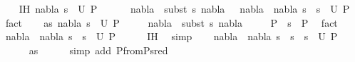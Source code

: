 \begin{isabellebody}
\ \ \isamarkupfalse%
\ IH{\isacharcolon}{\kern0pt}\ {\isachardoublequoteopen}{\isacharparenleft}{\kern0pt}nabla{}{\isacharcomma}{\kern0pt}\ s{}{\isacharparenright}{\kern0pt}\ {\isasymin}\ U\ P{}\ {\isasymLongrightarrow}\isanewline
\ \ \ \ \ nabla{}\ {\isasymTurnstile}\ {\isacharparenleft}{\kern0pt}subst\ s{}{\isacharparenright}{\kern0pt}\ nabla{}\ \ {\isasymLongrightarrow}\ {\isacharparenleft}{\kern0pt}nabla{}\ {\isasymunion}\ nabla{}{\isacharcomma}{\kern0pt}\ s{}\ {\isasymbullet}\ s{}{\isacharparenright}{\kern0pt}\ {\isasymin}\ U\ P{}{\isachardoublequoteclose}\ \isamarkupfalse%
\ fact{\isacharplus}{\kern0pt}\isanewline
\ \ \isamarkupfalse%
\ as{\isacharcolon}{\kern0pt}\ {\isachardoublequoteopen}{\isacharparenleft}{\kern0pt}nabla{}{\isacharcomma}{\kern0pt}\ s{}{\isacharparenright}{\kern0pt}\ {\isasymin}\ U\ P{}{\isachardoublequoteclose}\ \isanewline
\ \ \ \ {\isachardoublequoteopen}nabla{}\ {\isasymTurnstile}\ {\isacharparenleft}{\kern0pt}subst\ s{}{\isacharparenright}{\kern0pt}\ nabla{}{\isachardoublequoteclose}\ \isanewline
\ \ \ \ {\isachardoublequoteopen}P{}\ {\isasymturnstile}\ s\ {\isasymleadsto}\ P{}{\isachardoublequoteclose}\ \isamarkupfalse%
\ fact{\isacharplus}{\kern0pt}\isanewline
\ \ \isamarkupfalse%
\ {\isachardoublequoteopen}{\isacharparenleft}{\kern0pt}nabla{}\ {\isasymunion}\ nabla{}{\isacharcomma}{\kern0pt}\ s{}\ {\isasymbullet}\ s{}{\isacharparenright}{\kern0pt}\ {\isasymin}\ U\ P{}{\isachardoublequoteclose}\isanewline
\ \ \ \ \isamarkupfalse%
\ IH\ \isamarkupfalse%
\ simp\isanewline
\ \ \isamarkupfalse%
\ {\isachardoublequoteopen}{\isacharparenleft}{\kern0pt}nabla{}\ {\isasymunion}\ nabla{}{\isacharcomma}{\kern0pt}\ {\isacharparenleft}{\kern0pt}s{}\ {\isasymbullet}\ s{}{\isacharparenright}{\kern0pt}\ {\isasymbullet}\ s{\isacharparenright}{\kern0pt}\ {\isasymin}\ U\ P{}{\isachardoublequoteclose}\isanewline
\ \ \ \ \isamarkupfalse%
\ as{\isacharparenleft}{\kern0pt}{}{\isacharparenright}{\kern0pt}\isanewline
\ \ \ \ \isamarkupfalse%
\ {\isacharparenleft}{\kern0pt}simp\ add{\isacharcolon}{\kern0pt}\ P{}{\isacharunderscore}{\kern0pt}from{\isacharunderscore}{\kern0pt}P{}{\isacharunderscore}{\kern0pt}sred{\isacharparenright}{\kern0pt}\isanewline

\end{isabellebody}
